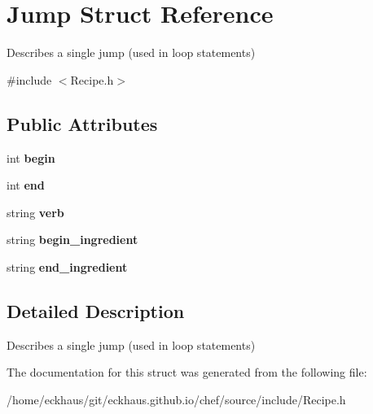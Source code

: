 \hypertarget{structJump}{\section{Jump Struct Reference}
\label{structJump}
}


Describes a single jump (used in loop statements)  




{\ttfamily \#include $<$Recipe.\-h$>$}

\subsection*{Public Attributes}
\begin{DoxyCompactItemize}
\item 
\hypertarget{structJump_aacc2efa25696a52f6f61f62267ab2f47}{int {\bfseries begin}}\label{structJump_aacc2efa25696a52f6f61f62267ab2f47}

\item 
\hypertarget{structJump_aa71cf756358c686638ffc89fa770d479}{int {\bfseries end}}\label{structJump_aa71cf756358c686638ffc89fa770d479}

\item 
\hypertarget{structJump_a17951d7947d33ea44e3bc961098721b6}{string {\bfseries verb}}\label{structJump_a17951d7947d33ea44e3bc961098721b6}

\item 
\hypertarget{structJump_a3a86e53486aa1fd1e53ce1e4419b72b0}{string {\bfseries begin\-\_\-ingredient}}\label{structJump_a3a86e53486aa1fd1e53ce1e4419b72b0}

\item 
\hypertarget{structJump_afbc8174b322f14a877dd6f276d078bb1}{string {\bfseries end\-\_\-ingredient}}\label{structJump_afbc8174b322f14a877dd6f276d078bb1}

\end{DoxyCompactItemize}


\subsection{Detailed Description}
Describes a single jump (used in loop statements) 

The documentation for this struct was generated from the following file\-:\begin{DoxyCompactItemize}
\item 
/home/eckhaus/git/eckhaus.\-github.\-io/chef/source/include/Recipe.\-h\end{DoxyCompactItemize}
